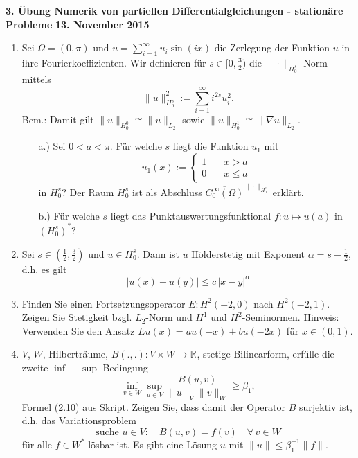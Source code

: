 \documentclass[11pt,a4paper]{report}
\newcommand{\R}[1]{\mathbb{R}^{#1}}
\begin{document}
\begin{center}
\textbf{3. \"Ubung Numerik von partiellen Differentialgleichungen - station\"are Probleme} \newline 
\textbf{13. November 2015}
\end{center}
\begin{enumerate}


\item Sei $\Omega = (0,\pi)$ und $u = \sum\limits_{i=1}^\infty u_i\sin(ix)$ die Zerlegung der Funktion $u$ in ihre Fourierkoeffizienten. Wir definieren f\"ur $s \in [0,\frac{3}{2})$ die $\| \cdot \|_{H_0^s}$ Norm mittels
$$\| u \|^2_{H_0^s}:= \sum\limits_{i=1}^\infty i^{2s} u_i^2 . $$
Bem.: Damit gilt $\| u \|_{H_0^0} \cong \| u \| _{L_2}$ sowie $\| u \|_{H_0^1} \cong \| \nabla u \|_{L_2} $.
\begin{itemize}
\item[a.)] Sei $0<a<\pi$. F\"ur welche $s$ liegt die Funktion $u_1$ mit $$u_1(x):=\left\{\begin{aligned} 1 & \quad x>a \\ 0 & \quad x\leq a \end{aligned}\right.$$ in $H_0^s$? Der Raum $H_0^s$ ist als Abschluss $\overline{C_0^\infty(\Omega)}^{\|\cdot\|_{H_0^s}}$ erkl\"art.
\item[b.)] F\"ur welche $s$ liegt das Punktauswertungsfunktional $f: u\mapsto u(a)$ in $(H_0^s)^*$?
\end{itemize}


\item Sei $s \in(\frac{1}{2}, \frac{3}{2})$ und $u \in H_0^s$. Dann ist $u$ H\"olderstetig mit Exponent $\alpha = s-\frac{1}{2}$, d.h. es gilt
$$|u(x)-u(y) | \leq c\,|x-y|^\alpha $$

\item Finden Sie einen Fortsetzungsoperator $E : H^2(-2,0)$ nach
  $H^2(-2,1)$. Zeigen Sie Stetigkeit bzgl. $L_2$-Norm und $H^1$ und
  $H^2$-Seminormen.  Hinweis: Verwenden Sie den Ansatz $Eu(x) = a
  u(-x) + b u(-2x)$ f\"ur $x \in (0,1)$. 



\item $V$, $W$, Hilbertr\"aume,  $B(.,.) : V \times W \rightarrow \R{}$,
  stetige Bilinearform, erf\"ulle die zweite $\inf-\sup$ Bedingung 
$$
\inf_{v \in W} \sup_{u \in V} \frac{B(u,v)}{\|u\|_V \| v\|_W} \geq \beta_1,
$$
Formel (2.10) aus Skript. Zeigen Sie, dass damit der Operator $B$
surjektiv ist, d.h. das Variationsproblem
$$
\text{suche } u \in V: \quad B(u,v) = f(v) \quad \forall \, v \in W
$$
 f\"ur alle $f \in W^\ast$ l\"osbar ist. Es gibt eine L\"osung $u$
 mit $\|u \| \leq \beta_1^{-1} \| f\|$.  


\end{enumerate}
\end{document}
